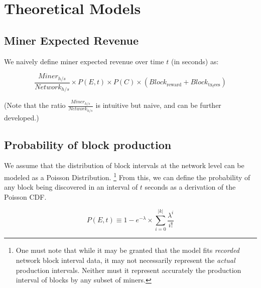 \documentclass[11pt]{article}
\theoremstyle{plain}
\begin{document}
\pagebreak
\section{\normalsize{Theoretical Models}}



\subsection{\normalsize{Miner Expected Revenue}}

We naively define miner expected revenue over time $t$ (in seconds) as:

\newcommand{\minerHashrate}{Miner_{h/s}}
\newcommand{\networkHashrate}{Network_{h/s}}
\newcommand{\blockReward}{Block_\mathrm{reward}}
\newcommand{\blockTransactionFees}{Block_\mathrm{tx_fees}}

\begin{equation}
\frac{\minerHashrate}{\networkHashrate}
\times
P(E,t)
\times
P(C)
\times
(\blockReward + \blockTransactionFees)
\end{equation}

(Note that the ratio $\frac{\minerHashrate}{\networkHashrate}$ is intuitive but
naive, and can be further developed.)

\subsection{\normalsize{Probability of block production}}

We assume that the distribution of block intervals at the network level can be
modeled as a Poisson Distribution.\nolinebreak
\footnote{
One must note that while it may be granted that the model fits \emph{recorded}
network block interval data, it may not necessarily represent the \emph{actual}
production intervals. Neither must it represent accurately the production
interval of blocks by any subset of miners.
}
From this, we can define the probability of any block being discovered in an
interval of $t$ seconds as a derivation of the Poisson CDF.

\begin{equation}
P(E,t) \equiv 1 - e^{-\lambda} \times \sum_{i=0}^{|k|}{\frac{\lambda^{i}}{i!}} 
\end{equation}
\end{document}
